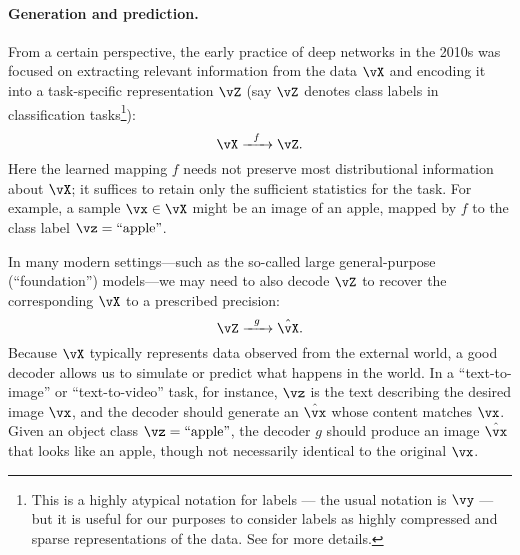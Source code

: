 \documentclass[../../book-main.tex]{subfiles}
\begin{document}
\paragraph{Generation and prediction.}
From a certain perspective, the early practice of deep networks in the 2010s was focused on extracting relevant information from the data \(\vX\) and encoding it into a task-specific representation \(\vZ\) (say \(\vZ\) denotes class labels in classification tasks\footnote{This is a highly atypical notation for labels --- the usual notation is \(\vy\) --- but it is useful for our purposes to consider labels as highly compressed and sparse representations of the data. See  for more details.}):
\begin{equation}
    \vX   \xrightarrow{\hspace{2mm} f \hspace{2mm}} \vZ.
       \label{eqn:encoding-deep-networks}
\end{equation}
Here the learned mapping \(f\) needs not preserve most distributional information about \(\vX\); it suffices to retain only the sufficient statistics for the task. For example, a sample \(\vx \in \vX\) might be an image of an apple, mapped by \(f\) to the class label \(\vz = \text{``apple''}\). 

In many modern settings---such as the so-called large general-purpose (``foundation'') models---we may need to also decode \(\vZ\) to recover the corresponding \(\vX\) to a prescribed precision:
\begin{equation}
    \vZ   \xrightarrow{\hspace{2mm} g  \hspace{2mm}} \hat{\vX}.
       \label{eqn:decoding-deep-networks}
\end{equation}
Because \(\vX\) typically represents data observed from the external world, a good decoder allows us to simulate or predict what happens in the world. In a ``text-to-image'' or ``text-to-video'' task, for instance, \(\vz\) is the text describing the desired image \(\vx\), and the decoder should generate an \(\hat{\vx}\) whose content matches \(\vx\). Given an object class \(\vz = \text{``apple''}\), the decoder \(g\) should produce an image \(\hat{\vx}\) that looks like an apple, though not necessarily identical to the original \(\vx\).
\end{document}
